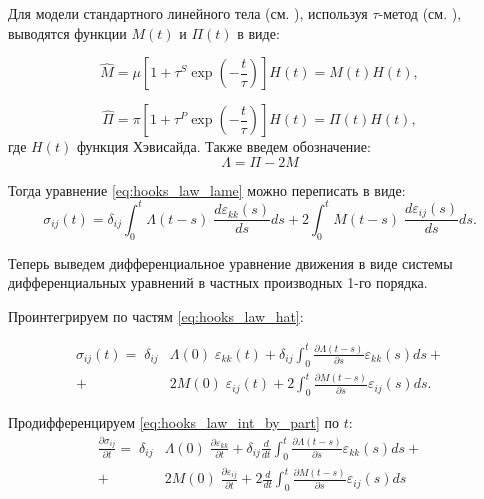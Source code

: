 \documentclass[a4paper, fontsize=14pt]{article}
\begin{document}
Для модели стандартного линейного тела (см. \cite{Mainardi,Carcione}), используя $\tau$-метод (см. \cite{t-method}), выводятся функции $M(t)$ и $\Pi(t)$ в виде:

\begin{equation}
    \label{eq:mu}
    \hat{M} =\mu \left[ 1 + \tau^S \exp \left( - \frac{t}{\tau} \right)\right] H (t) = M(t) H(t),
\end{equation}

\begin{equation}
    \label{eq:k}
    \hat{\Pi} = \pi \left[ 1 + \tau^P \exp \left( - \frac{t}{\tau} \right)\right] H (t) = \Pi(t) H(t),
\end{equation}
где $H(t)$ функция Хэвисайда. Также введем обозначение:
\begin{equation}
    \Lambda = \Pi - 2 M
\end{equation}

Тогда уравнение \eqref{eq:hooks_law_lame} можно переписать в виде:
\begin{equation}
    \label{eq:hooks_law_hat}
    \sigma_{ij}(t) = \delta_{ij} \int_0^t \Lambda(t - s) \; \frac{d \varepsilon_{kk}(s)}{d s} ds + 2 \int_0^t M(t - s) \; \frac{d \varepsilon_{ij}(s)}{d s} ds.  
\end{equation}

Теперь выведем дифференциальное уравнение движения в виде системы дифференциальных уравнений в частных производных 1-го порядка.

Проинтегрируем по частям \eqref{eq:hooks_law_hat}:

\begin{equation}
    \label{eq:hooks_law_int_by_part}
    \begin{aligned}
        \sigma_{ij}(t) = \; \delta_{ij} & \Lambda(0) \; \varepsilon_{kk}(t) + \delta_{ij} \int_0^t \frac{\partial \Lambda(t - s)}{\partial s}  \varepsilon_{kk}(s) ds + \\
        + & 2 M(0) \; \varepsilon_{ij}(t) + 2 \int_0^t \frac{\partial M(t - s)}{\partial s}  \varepsilon_{ij}(s) ds.
    \end{aligned}
\end{equation}


Продифференцируем \eqref{eq:hooks_law_int_by_part} по $t$:
\begin{equation}
    \label{eq:hooks_law_int_by_part_differentiate}
    \begin{aligned}
        \frac{\partial \sigma_{ij}}{\partial t}  = \; \delta_{ij} & \Lambda(0) \; \frac{\partial \varepsilon_{kk}}{\partial t}  + \delta_{ij} \frac{d}{dt} \int_0^t \frac{\partial \Lambda(t - s)}{\partial s}  \varepsilon_{kk}(s) ds + \\
        + & 2 M(0) \; \frac{\partial \varepsilon_{ij}}{\partial t} + 2 \frac{d}{dt} \int_0^t \frac{\partial M(t - s)}{\partial s}  \varepsilon_{ij}(s) ds 
    \end{aligned}
\end{equation}
\end{document}
